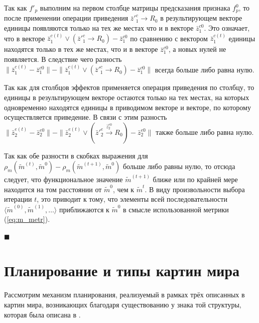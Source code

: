 \documentclass[a4paper, 12pt]{article}
\theoremstyle{plain}
\newenvironment{Proof}%
	{\par\noindent{\bf Доказательство.}}%
	{\hfill$\scriptstyle\blacksquare$}
\begin{document}
\begin{Proof}
		Так как $f'_p$ выполним на первом столбце матрицы предсказания признака $f_p^0$, то после применении операции приведения $\bar z'^c_1\rightarrow R_0$ в результирующем векторе единицы появляются только на тех же местах что и в векторе $\bar z_1^{c0}$. Это означает, что в векторе $\bar z_1^{c(t)}\vee (\bar z'^c_1\rightarrow R_0)-\bar z_1^{c0}$ по сравнению с вектором $\bar z_1^{c(t)}$  единицы находятся только в тех же местах, что и в векторе $\bar z_1^{c0}$, а новых нулей не появляется. В следствие чего разность $\|\bar z_1^{c(t)}-\bar z_1^{c0}\|-\|\bar z_1^{c(t)}\vee (\bar z'^c_1\rightarrow R_0)-\bar z_1^{c0}\|$ всегда больше либо равна нулю.
		
		Так как для столбцов эффектов применяется операция приведения по столбцу, то единицы в результирующем векторе остаются только на тех местах, на которых одновременно находятся единицы в приводимом векторе и векторе, по которому осуществляется приведение. В связи с этим разность $\|\bar z_2^{e(t)}-\bar z_2^{e0}\|-\|\bar z_2^{e(t)}\vee (\bar z'^e_2\xrightarrow{\bar z_2^{e0}} R_0)-\bar z_2^{e0}\|$ также больше либо равна нулю.
		
		Так как обе разности в скобках выражения для $\rho_m(\tilde m^{(t)},\tilde m^0)-\rho_m(\tilde m^{(t+1)},\tilde m^0)$ больше либо равны нулю, то отсюда следует, что функциональное значение $\tilde m^{(t+1)}$ ближе или по крайней мере находится на том расстоянии от $\tilde m^0$, чем к $\tilde m^{t}$. В виду произвольности выбора итерации $t$, это приводит к тому, что элементы всей последовательности $\langle\tilde m^{(0)},\tilde m^{(1)},\dots\rangle$ приближаются к $\tilde m^0$ в смысле использованной метрики (\ref{eq:m_metr}). 

	\end{Proof}
	
	\section{Планирование и типы картин мира} \label{sect:plan_wm}
	Рассмотрим механизм планирования, реализуемый в рамках трёх описанных в \cite{Chudova2012a} картин мира, возникающих благодаря существованию у знака той структуры, которая была описана в \cite{PanovA2014a}.
	
\end{document}
